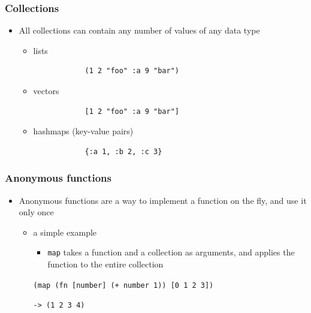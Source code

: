 \documentclass{beamer}
\begin{document}
\begin{frame}[fragile]
\frametitle{Collections}
    \begin{itemize}
         \item All collections can contain any number of values of any data type
	 \begin{itemize}
	   \item lists
	   \begin{verbatim}
	        (1 2 "foo" :a 9 "bar")
	   \end{verbatim}
  	   \item vectors
  	   \begin{verbatim}
	        [1 2 "foo" :a 9 "bar"]
	   \end{verbatim}
  	   \item hashmaps (key-value pairs)
  	   \begin{verbatim}
	    	{:a 1, :b 2, :c 3}
	   \end{verbatim}
	 \end{itemize}
    \end{itemize}
\end{frame}

\begin{frame}[fragile]
\frametitle{Anonymous functions}
	\begin{itemize}
  	  \item Anonymous functions are a way to implement a function on the fly, and use it only once
  	  \begin{itemize}
  	    \item a simple example
  	    \begin{itemize}
  	 	  \item \texttt{map} takes a function and a collection as arguments, and applies the function to the entire collection
  	    \end{itemize}
  	    
		\texttt{(map (fn [number] (+ number 1)) [0 1 2 3])}
		
		\texttt{-> (1 2 3 4)}
	 \end{itemize}
   \end{itemize}
\end{frame}
\end{document}
